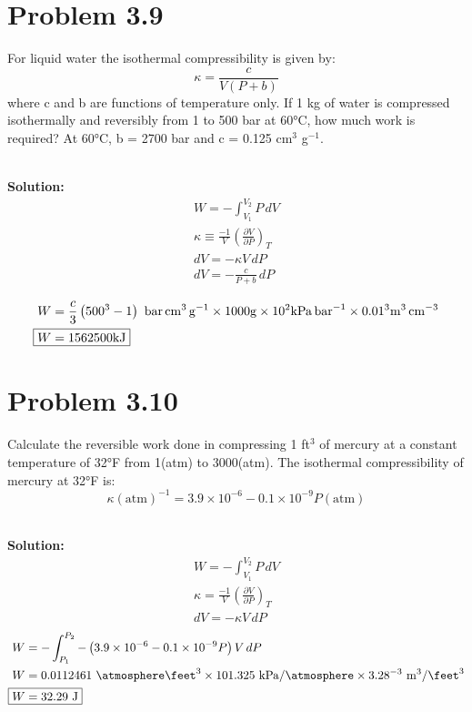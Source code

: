 \documentclass{article}
\newenvironment{solution}{\par\noindent\textbf{\\Solution:\\}}{\par\medskip}
\begin{document}
\section*{Problem 3.9}
For liquid water the isothermal compressibility is given by:
$$ \kappa = \frac{c}{V(P+b)} $$
where c and b are functions of temperature only. If 1 kg of water is compressed isothermally and reversibly from 1 to 500 bar at 60°C, how much work is required? At 60°C, b = 2700 bar and c = 0.125 cm$^3$ g$^{-1}$.

\begin{solution}
    \begin{gather*}
          W = -\int_{V_{1}}^{V_{2}} P \, dV \\
          \kappa \equiv \frac{-1}{V}\left( \frac{\partial V}{\partial P} \right)_{T} \\
          dV = -\kappa V \, dP \\
          dV = -\frac{c}{P+b}\,dP \\
    \end{gather*}
    \vspace{-3em}
    \begin{align*}
        W & = \frac{c}{3}\left( 500^{3}-1 \right)~\unit{ \bar\centi\meter\cubed\per\gram }\times 1000\unit{ \gram } \times 10^{2}\unit{ \kilo\pascal\per\bar }\times 0.01^{3}\unit{ \meter\cubed\per\centi\meter\cubed } \\
        \Aboxed{ W & = 1562500\unit{ \kilo\joule } }
    \end{align*}
\end{solution}

\section*{Problem 3.10}
Calculate the reversible work done in compressing 1 ft$^3$ of mercury at a constant temperature of 32°F from 1(atm) to 3000(atm). The isothermal compressibility of mercury at 32°F is:
$$ \kappa(\text{atm})^{-1} = 3.9 \times 10^{-6} - 0.1 \times 10^{-9} P(\text{atm}) $$

\begin{solution}
    \begin{gather*}
        W = -\int_{V_{1}}^{V_{2}} P \, dV \\
        \kappa = \frac{-1}{V}\left( \frac{\partial V}{\partial P} \right)_{T} \\
        dV = -\kappa V\,dP
    \end{gather*}
    \begin{align*}
        W &= -\int_{P_{1}}^{P_{2}} -\left( 3.9\times10^{-6}-0.1\times10^{-9}P \right)V \, dP \\
        W &= 0.0112461~\unit{ \atmosphere\feet\cubed } \times 101.325~\unit{ \kilo\pascal\per\atmosphere }\times 3.28^{-3}~\unit{ \meter\cubed\per\feet\cubed } \\
        \Aboxed{ W &= 32.29~\unit{ \joule } }
    \end{align*}
\end{solution}
\end{document}
